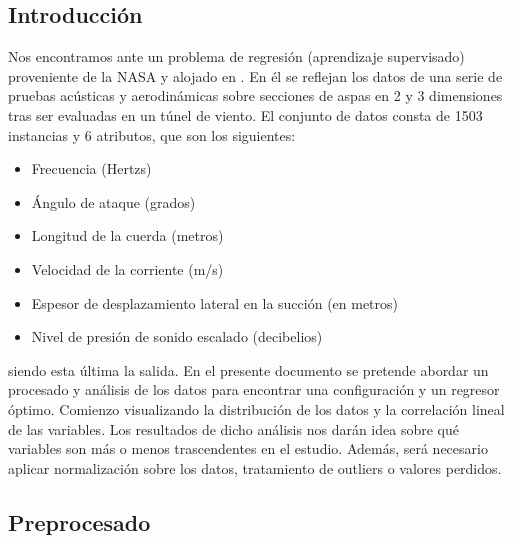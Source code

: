 \subsection{Introducción}

Nos encontramos ante un problema de regresión (aprendizaje supervisado) proveniente de la NASA y alojado en \cite{airfoil-data}. En él se reflejan los datos de una serie de pruebas acústicas y aerodinámicas sobre secciones de aspas en 2 y 3 dimensiones tras ser evaluadas en un túnel de viento. El conjunto de datos consta de 1503 instancias y 6 atributos, que son los siguientes:

\begin{itemize}
	\item Frecuencia (Hertzs)
	\item Ángulo de ataque (grados)
	\item Longitud de la cuerda (metros)
	\item Velocidad de la corriente (m/s)
	\item Espesor de desplazamiento lateral en la succión (en metros)
	\item Nivel de presión de sonido escalado (decibelios) 
\end{itemize}

siendo esta última la salida. En el presente documento se pretende abordar un procesado y análisis de los datos para encontrar una configuración y un regresor óptimo. Comienzo visualizando la distribución de los datos y la correlación lineal de las variables. Los resultados de dicho análisis nos darán idea sobre qué variables son más o menos trascendentes en el estudio. Además, será necesario aplicar normalización sobre los datos, tratamiento de outliers o valores perdidos.

\newpage

\subsection{Preprocesado}

